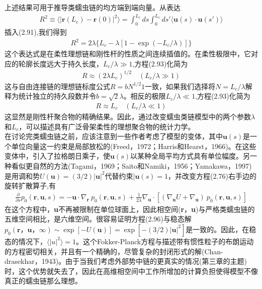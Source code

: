 \documentclass[12pt]{article}
\begin{document}
\begin{CJK}{UTF8}{gkai}
上述结果可用于推导类蠕虫链的均方端到端向量。从表达\\
\begin{gather}
R^2 \equiv\langle|\textbf{r}(L_c)-\textbf{r}(0)|^2\rangle =\int_{0}^{L_c}ds \int_{0}^{L_c}ds'\langle \textbf{u}(s)\cdot \textbf{u}(s')\rangle
\end{gather}
插入(2.91),我们得到\\
\begin{gather}
R^2 =2\lambda\{L_c-\lambda[1-\exp(-L_c/\lambda)]\}
\end{gather}
这个表达式是在柔性理想链和刚性杆的性质之间连续插值的。在柔性极限中，它对应的轮廓长度远大于持久长度，$L_c/\lambda \gg 1$,方程(2.93)化简为\\
\begin{gather}
R\approx(2\lambda L_c)^{1/2} \quad (L_c/\lambda \gg 1)
\end{gather}
这与自由连接链的理想链标度公式$R=bN^{1/2} 1$一致，如果我们选择将$N=L_c/\lambda$解释为统计独立的持久段数并令$b=\sqrt{2}\lambda$。相反的极限$L_c/\lambda \ll 1$,方程(2.93)化简为\\
\begin{gather}
R \approx L_c \quad (L_c/\lambda \ll 1)
\end{gather}
这显然是刚性杆聚合物的精确结果。因此，通过改变蠕虫类链模型中的两个参数$\lambda$和$L_c$，可以描述具有广泛骨架柔性的理想聚合物的统计力学。\\
在讨论完类蠕虫链之前，应该注意到一些作者考虑了模型的变体，其中$\textbf{u}(s)$是一个单位向量这一约束是局部放松的(Freed，1972；Harris和Hearst，1966)。在这些变体中，引入了拉格朗日乘子，使$\textbf{u}(s)$以某种全局平均方式具有单位幅度。另一种看似更自然的方法(Tagami，1969；Saito和Namiki，1956；Yamakawa，1997)是用调和势$U(\textbf{u})=(3/2)|\textbf{u}|^2$代替约束$|\textbf{u}(s)=1$，并改变方程(2.76)右手边的旋转扩散算子,有\\
\begin{gather}
\frac{\partial}{\partial s}p_0(\textbf{r},\textbf{u},s)=-\textbf{u}\cdot \nabla_\textbf{r} \ p_0(\textbf{r},\textbf{u},s)+\frac{1}{2\lambda}\nabla_\textbf{u}\cdot [(\nabla_\textbf{u}U+\nabla_\textbf{u})\ p_0(\textbf{r},\textbf{u},s)]
\end{gather}
在这个方程中，\textbf{u}不再被限制在单位球面上，因此相空间(\textbf{r}，\textbf{u})与严格类蠕虫链的五维空间相比，是六维空间。很容易证明方程(2.96)与稳态解$p_0(\textbf{r}，\textbf{u}，\infty)\sim \exp[−U(\textbf{u})]=\exp[−(3/2)|\textbf{u}|^2]$是一致的。因此，在稳态的情况下，$\langle |u|^2\rangle=1$。这个Fokker-Planck方程与描述带有惯性粒子的布朗运动的方程密切相关，并且有一个精确的，尽管复杂的封闭形式的解(Chan-drasekhar，1943)。由于当我们考虑外部势中链的更真实的情况(第三章的主题)时，这个优势就失去了，因此在高维相空间中工作所增加的计算负担使得模型不像真正的蠕虫链那么理想。\\


\end{CJK}
\end{document}
